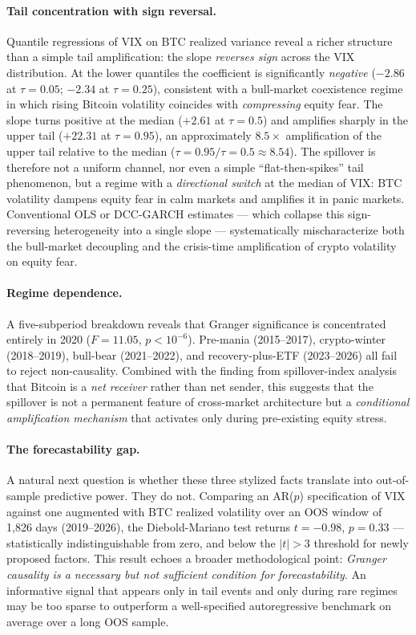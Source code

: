 \documentclass[11pt,a4paper]{article}
\begin{document}
\paragraph{Tail concentration with sign reversal.} Quantile regressions of VIX on BTC realized variance reveal a richer structure than a simple tail amplification: the slope \emph{reverses sign} across the VIX distribution. At the lower quantiles the coefficient is significantly \emph{negative} ($-2.86$ at $\tau = 0.05$; $-2.34$ at $\tau = 0.25$), consistent with a bull-market coexistence regime in which rising Bitcoin volatility coincides with \emph{compressing} equity fear. The slope turns positive at the median ($+2.61$ at $\tau = 0.5$) and amplifies sharply in the upper tail ($+22.31$ at $\tau = 0.95$), an approximately $8.5\times$ amplification of the upper tail relative to the median ($\tau = 0.95 / \tau = 0.5 \approx 8.54$).%
 The spillover is therefore not a uniform channel, nor even a simple ``flat-then-spikes'' tail phenomenon, but a regime with a \emph{directional switch} at the median of VIX: BTC volatility dampens equity fear in calm markets and amplifies it in panic markets. Conventional OLS or DCC-GARCH estimates --- which collapse this sign-reversing heterogeneity into a single slope --- systematically mischaracterize both the bull-market decoupling and the crisis-time amplification of crypto volatility on equity fear.

\paragraph{Regime dependence.} A five-subperiod breakdown reveals that Granger significance is concentrated entirely in 2020 ($F = 11.05$, $p < 10^{-6}$). Pre-mania (2015--2017), crypto-winter (2018--2019), bull-bear (2021--2022), and recovery-plus-ETF (2023--2026) all fail to reject non-causality. Combined with the finding from \citet{diebold2012} spillover-index analysis that Bitcoin is a \emph{net receiver} rather than net sender, this suggests that the spillover is not a permanent feature of cross-market architecture but a \emph{conditional amplification mechanism} that activates only during pre-existing equity stress.

\paragraph{The forecastability gap.} A natural next question is whether these three stylized facts translate into out-of-sample predictive power. They do not. Comparing an AR($p$) specification of VIX against one augmented with BTC realized volatility over an OOS window of 1,826 days (2019--2026), the Diebold-Mariano test returns $t = -0.98$, $p = 0.33$ --- statistically indistinguishable from zero, and below the \citet{harvey2016} $|t| > 3$ threshold for newly proposed factors. This result echoes a broader methodological point: \emph{Granger causality is a necessary but not sufficient condition for forecastability}. An informative signal that appears only in tail events and only during rare regimes may be too sparse to outperform a well-specified autoregressive benchmark on average over a long OOS sample.
\end{document}
